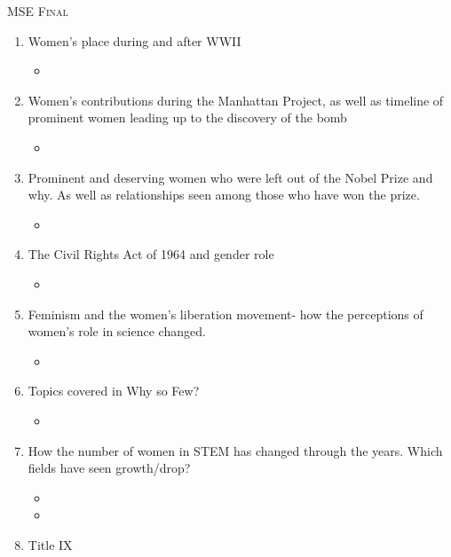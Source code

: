\documentclass[12pt,a4paper]{article}
\begin{document}
  \begin{center}
    \large\textsc{MSE Final}
  \end{center}

\begin{enumerate}
  \item Women’s place during and after WWII
  \begin{itemize}
    \item[] 
  \end{itemize}
  \item Women’s contributions during the Manhattan Project, as well as timeline of prominent women leading up to the discovery of the bomb
  \begin{itemize}
    \item[] 
  \end{itemize}
  \item Prominent and deserving women who were left out of the Nobel Prize and why. As well as relationships seen among those who have won the prize.
  \begin{itemize}
    \item[] 
  \end{itemize}
  \item The Civil Rights Act of 1964 and gender role
  \begin{itemize}
    \item[] 
  \end{itemize}
  \item Feminism and the women’s liberation movement- how the perceptions of women’s role in science changed.
  \begin{itemize}
    \item[] 
  \end{itemize}
  \item Topics covered in Why so Few?
  \begin{itemize}
    \item[] 
  \end{itemize}
  \item How the number of women in STEM has changed through the years. Which fields have seen growth/drop?
  \begin{itemize}
    \item[] 
  \end{itemize}
  \begin{itemize}
    \item[] 
  \end{itemize}
  \item Title IX
  \begin{itemize}

\end{itemize}
\end{enumerate}
\end{document}
